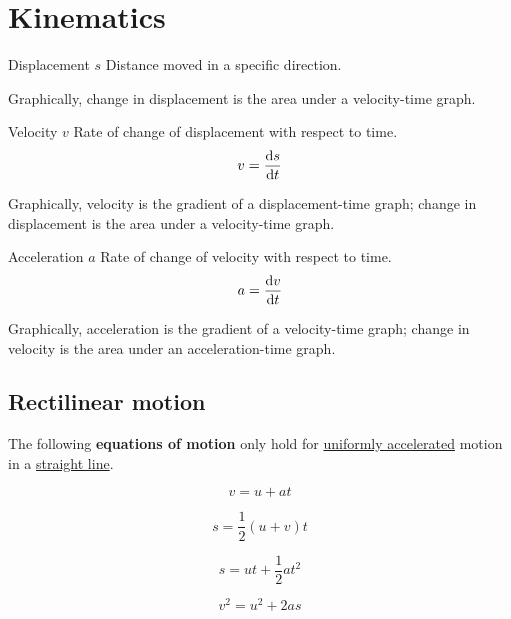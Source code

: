 \section{Kinematics}

\begin{defn}{Displacement $s$}{}
Distance moved in a specific direction. 
\end{defn} 
Graphically, change in displacement is the area under a velocity-time graph.

\begin{defn}{Velocity $v$}{}
Rate of change of displacement with respect to time. 
\begin{equation} 
v = \odv{s}{t} 
\end{equation}
\end{defn} 
Graphically, velocity is the gradient of a displacement-time graph; change in displacement is the area under a velocity-time graph.

\begin{defn}{Acceleration $a$}{}
Rate of change of velocity with respect to time. 
\begin{equation} 
a = \odv{v}{t}
\end{equation}
\end{defn} 
Graphically, acceleration is the gradient of a velocity-time graph; change in velocity is the area under an acceleration-time graph.

\subsection{Rectilinear motion}
The following \textbf{equations of motion} only hold for \underline{uniformly accelerated} motion in a \underline{straight line}.

\begin{equation}\label{eqn_mtn1} v=u+at \end{equation}

\begin{equation}\label{eqn_mtn2} s=\frac{1}{2}(u+v)t \end{equation}

\begin{equation}\label{eqn_mtn3} s=ut+\frac{1}{2}at^2 \end{equation}

\begin{equation}\label{eqn_mtn4} v^2=u^2+2as \end{equation}


